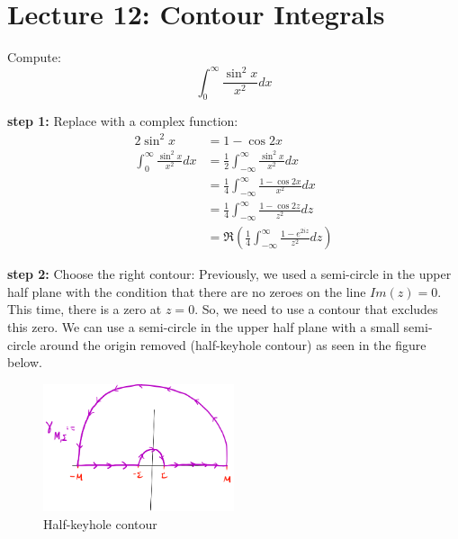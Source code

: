 \chapter{Lecture 12: Contour Integrals}

\begin{example}
    Compute:
    $$\int_{0}^{\infty} \frac{\sin^2 x}{x^2} dx$$

    \textbf{step 1:} Replace with a complex function:
    \begin{align*}
        2\sin^2 x                                 & = 1 - \cos 2x                                                                       \\
        \int_{0}^{\infty} \frac{\sin^2 x}{x^2} dx & = \frac{1}{2} \int_{-\infty}^{\infty} \frac{\sin^2 x}{x^2} dx                       \\
                                                  & = \frac{1}{4} \int_{-\infty}^{\infty} \frac{1 - \cos 2x}{x^2} dx                    \\
                                                  & = \frac{1}{4} \int_{-\infty}^{\infty} \frac{1 - \cos 2z}{z^2} dz                    \\
                                                  & = \Re \left( \frac{1}{4} \int_{-\infty}^{\infty} \frac{1 - e^{2iz}}{z^2} dz \right)
    \end{align*}

    \textbf{step 2:} Choose the right contour:
    Previously, we used a semi-circle in the upper half plane with the condition that there are no zeroes on the line $Im(z) = 0$. This time, there is a zero at $z = 0$. So, we need to use a contour that excludes this zero. We can use a semi-circle in the upper half plane with a small semi-circle around the origin removed (half-keyhole contour) as seen in the figure below.
    \begin{figure}[H]
        \centering
        \includegraphics[width=0.5\textwidth]{LECTURE_12/half-keyhole.png}
        \caption{Half-keyhole contour}
        \label{fig:half-keyhole}
    \end{figure}


\end{example}
